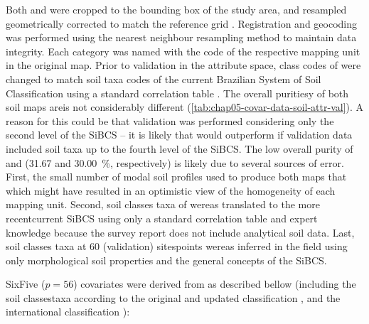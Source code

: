 Both \soilOld{} and \soilNew{} were cropped to the bounding box of the study area, and resampled geometrically 
corrected 
to match the reference grid . Registration and geocoding was performed using the nearest neighbour resampling 
method to maintain data integrity. Each category was named with the code of the respective mapping unit in the 
original map. Prior to validation in the attribute space, class codes of \soilOld{} were changed to match soil 
taxa codes of the current Brazilian System of Soil Classification using a standard correlation table 
\cite{SantosEtAl2006}. The overall puritiesy of both soil maps areis not considerably different 
(\autoref{tab:chap05-covar-data-soil-attr-val}). A reason for this could be that validation was performed 
considering 
only the second level of the SiBCS -- it is likely that \soilNew{} would outperform \soilOld{} if validation 
data included soil taxa up to the fourth level of the SiBCS. The low overall purity of \soilOld{} and 
\soilNew{} (\num{31.67} and \SI{30.00}{\percent}, respectively) is likely due to several sources of error. 
First, the small number of modal soil profiles used to produce both maps that which might have resulted in an 
optimistic 
view of the homogeneity of each mapping unit. Second, soil classes taxa of \soilOld{} wereas translated to the 
more recentcurrent 
SiBCS using only a standard correlation table \cite{SantosEtAl2006} and expert knowledge because the survey 
report does not include analytical soil data. Last, soil classes taxa at \num{60} (validation) sitespoints 
wereas inferred in the field 
using only morphological soil properties and the general concepts of the SiBCS.

SixFive ($p = 56$) covariates were derived from \soilOld{} as described bellow (including the soil classestaxa 
according 
to the original and updated classification \cite{AzolinEtAl1988, SantosEtAl2013a}, and the international 
classification \cite{IUSSWorkingGroupWRB2007}):


